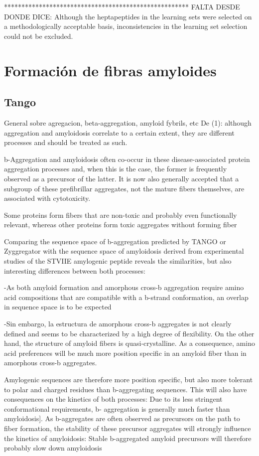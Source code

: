 *****************************************************
FALTA DESDE DONDE DICE:  Although the heptapeptides in the learning sets were selected on a methodologically acceptable basis, inconsistencies in the learning set selection could not be excluded.


\section{Formación de fibras amyloides}

\subsection{Tango}

General sobre agregacion, beta-aggregation, amyloid fybrils, etc
De (1): although aggregation and amyloidosis correlate to a certain extent, they are different
processes and should be treated as such.

b-Aggregation and amyloidosis often co-occur in these disease-associated protein aggregation processes and, when this is the case, the former is frequently observed as a precursor of the latter. It is now also generally accepted that a subgroup of these prefibrillar
aggregates, not the mature fibers themselves, are associated with cytotoxicity.

Some proteins form fibers that are non-toxic and probably even functionally relevant,
whereas other proteins form toxic aggregates without forming fiber

Comparing the sequence space of b-aggregation predicted by TANGO or Zyggregator with the sequence space of amyloidosis derived from experimental studies of the STVIIE amylogenic peptide reveals the similarities, but also interesting differences between both processes:

-As both amyloid formation and amorphous cross-b aggregation require amino acid compositions that are compatible with a b-strand conformation, an overlap in
sequence space is to be expected

-Sin embargo, la estructura de amorphous cross-b aggregates is not
clearly defined and seems to be characterized by a high degree of flexibility. On the other hand, the structure of amyloid fibers is quasi-crystalline. As a consequence, amino acid preferences will be much more position specific in an amyloid fiber than in amorphous cross-b aggregates.

Amylogenic sequences are therefore more position specific, but also more tolerant to polar and charged residues than b-aggregating sequences. This will also have consequences on the kinetics of both processes: Due to its less stringent conformational requirements, b-
aggregation is generally much faster than amyloidosis]. 
As b-aggregates are often observed as precursors on the path to fiber formation, the stability of these precursor aggregates will strongly influence the kinetics of amyloidosis: Stable b-aggregated amyloid precursors will therefore probably slow down amyloidosis

